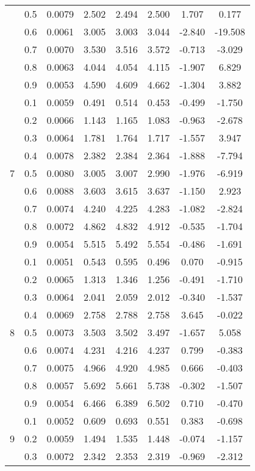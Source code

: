 \documentclass[11pt,a4paper]{report}
\begin{document}
\begin{longtable}{ | c | c || c | c | c | c | c | c | }
 & 0.5 & 0.0079 & 2.502 & 2.494 & 2.500 & 1.707 & 0.177 \\
 & 0.6 & 0.0061 & 3.005 & 3.003 & 3.044 & -2.840 & -19.508 \\
 & 0.7 & 0.0070 & 3.530 & 3.516 & 3.572 & -0.713 & -3.029 \\
 & 0.8 & 0.0063 & 4.044 & 4.054 & 4.115 & -1.907 & 6.829 \\
 & 0.9 & 0.0053 & 4.590 & 4.609 & 4.662 & -1.304 & 3.882 \\
 \hline
\multirow{9}{*}{7} & 0.1 & 0.0059 & 0.491 & 0.514 & 0.453 & -0.499 & -1.750 \\
 & 0.2 & 0.0066 & 1.143 & 1.165 & 1.083 & -0.963 & -2.678 \\
 & 0.3 & 0.0064 & 1.781 & 1.764 & 1.717 & -1.557 & 3.947 \\
 & 0.4 & 0.0078 & 2.382 & 2.384 & 2.364 & -1.888 & -7.794 \\
 & 0.5 & 0.0080 & 3.005 & 3.007 & 2.990 & -1.976 & -6.919 \\
 & 0.6 & 0.0088 & 3.603 & 3.615 & 3.637 & -1.150 & 2.923 \\
 & 0.7 & 0.0074 & 4.240 & 4.225 & 4.283 & -1.082 & -2.824 \\
 & 0.8 & 0.0072 & 4.862 & 4.832 & 4.912 & -0.535 & -1.704 \\
 & 0.9 & 0.0054 & 5.515 & 5.492 & 5.554 & -0.486 & -1.691 \\
 \hline
\multirow{9}{*}{8} & 0.1 & 0.0051 & 0.543 & 0.595 & 0.496 & 0.070 & -0.915 \\
 & 0.2 & 0.0065 & 1.313 & 1.346 & 1.256 & -0.491 & -1.710 \\
 & 0.3 & 0.0064 & 2.041 & 2.059 & 2.012 & -0.340 & -1.537 \\
 & 0.4 & 0.0069 & 2.758 & 2.788 & 2.758 & 3.645 & -0.022 \\
 & 0.5 & 0.0073 & 3.503 & 3.502 & 3.497 & -1.657 & 5.058 \\
 & 0.6 & 0.0074 & 4.231 & 4.216 & 4.237 & 0.799 & -0.383 \\
 & 0.7 & 0.0075 & 4.966 & 4.920 & 4.985 & 0.666 & -0.403 \\
 & 0.8 & 0.0057 & 5.692 & 5.661 & 5.738 & -0.302 & -1.507 \\
 & 0.9 & 0.0054 & 6.466 & 6.389 & 6.502 & 0.710 & -0.470 \\
 \hline
\multirow{9}{*}{9} & 0.1 & 0.0052 & 0.609 & 0.693 & 0.551 & 0.383 & -0.698 \\
 & 0.2 & 0.0059 & 1.494 & 1.535 & 1.448 & -0.074 & -1.157 \\
 & 0.3 & 0.0072 & 2.342 & 2.353 & 2.319 & -0.969 & -2.312 \\

\end{longtable}
\end{document}
